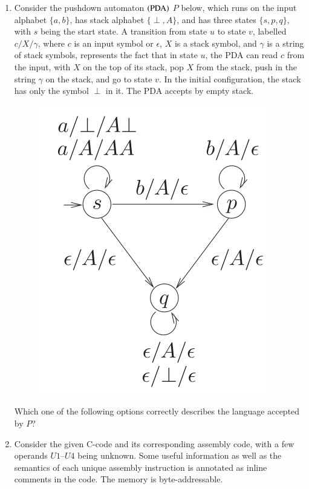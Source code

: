 \documentclass[journal,12pt,onecolumn]{IEEEtran}
\theoremstyle{remark}
\begin{document}
\begin{enumerate}
		\item Consider the pushdown automaton $\left(\text{PDA}\right)$ $P$ below, which runs on the input alphabet $\{a, b\}$, has stack alphabet $\{\perp, A\}$, and has three states $\{s, p, q\}$, with $s$ being the start state. A transition from state $u$ to state $v$, labelled $c/X/\gamma$, where $c$ is an input symbol or $\epsilon$, $X$ is a stack symbol, and $\gamma$ is a string of stack symbols, represents the fact that in state $u$, the PDA can read $c$ from the input, with $X$ on the top of its stack, pop $X$ from the stack, push in the string $\gamma$ on the stack, and go to state $v$. In the initial configuration, the stack has only the symbol $\perp$ in it. The PDA accepts by empty stack.
\begin{figure}[H]
	\centering
	\includegraphics[width=0.3\linewidth]{figs/screenshot014}
	\caption{}
	\label{fig:screenshot014}
\end{figure}
		
		Which one of the following options correctly describes the language accepted by $P$?
		
		\hfill{}
		
		\begin{enumerate}
		\end{enumerate}
		
		\item Consider the given C-code and its corresponding assembly code, with a few operands $U1$–$U4$ being unknown. Some useful information as well as the semantics of each unique assembly instruction is annotated as inline comments in the code. The memory is byte-addressable.
		

\end{enumerate}
\end{document}
